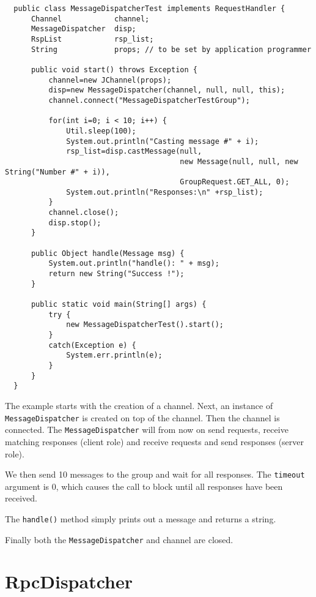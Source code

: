     \begin{small}
    \begin{verbatim}
  public class MessageDispatcherTest implements RequestHandler {
      Channel            channel;
      MessageDispatcher  disp;
      RspList            rsp_list;
      String             props; // to be set by application programmer

      public void start() throws Exception {
          channel=new JChannel(props);
          disp=new MessageDispatcher(channel, null, null, this);
          channel.connect("MessageDispatcherTestGroup");

          for(int i=0; i < 10; i++) {
              Util.sleep(100);
              System.out.println("Casting message #" + i);
              rsp_list=disp.castMessage(null,
                                        new Message(null, null, new String("Number #" + i)),
                                        GroupRequest.GET_ALL, 0);
              System.out.println("Responses:\n" +rsp_list);
          }
          channel.close();
          disp.stop();
      }

      public Object handle(Message msg) {
          System.out.println("handle(): " + msg);
          return new String("Success !");
      }

      public static void main(String[] args) {
          try {
              new MessageDispatcherTest().start();
          }
          catch(Exception e) {
              System.err.println(e);
          }
      }
  }
  \end{verbatim}
  \end{small}

  The example starts with the creation of a channel. Next, an instance of {\tt
  MessageDispatcher} is created on top of the channel. Then the channel is
  connected. The {\tt MessageDispatcher} will from now on send requests, receive
  matching responses (client role) and receive requests and send responses (server
  role).

  We then send 10 messages to the group and wait for all responses. The {\tt timeout}
  argument is 0, which causes the call to block until all responses have been
  received.

  The {\tt handle()} method simply prints out a message and returns a string.

  Finally both the {\tt MessageDispatcher} and channel are closed.

        

  \section{RpcDispatcher} \label{RpcDispatcher}

